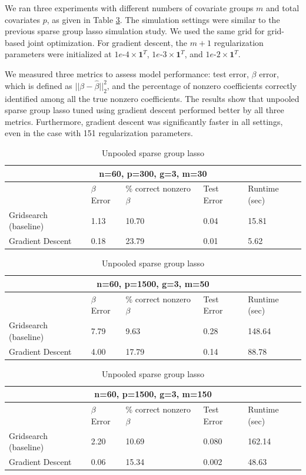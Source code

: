 \documentclass[10pt,letterpaper]{article}
\begin{document}
We ran three experiments with different numbers of covariate groups $m$ and total covariates $p$, as given in Table \ref{table:unpooled}. The simulation settings were similar to the previous sparse group lasso simulation study. We used the same grid for grid-based joint optimization. For gradient descent, the $m+1$ regularization parameters were initialized at $1e\text{-}4 \times \boldsymbol 1^T$, $1e\text{-}3 \times \boldsymbol 1^T$, and $1e\text{-}2 \times \boldsymbol 1^T$.

We measured three metrics to assess model performance: test error, $\beta$ error, which is defined as $\lvert \lvert \beta - \hat \beta \rvert \rvert_2 ^2$, and the percentage of nonzero coefficients correctly identified among all the true nonzero coefficients. The results show that unpooled sparse group lasso tuned using gradient descent performed better by all three metrics. Furthermore, gradient descent was significantly faster in all settings, even in the case with 151 regularization parameters.

\begin{table}
\begin{center}
\begin{tabular}{| l | l | l | l | l | }
\hline
\multicolumn{5}{|c|}{n=60, p=300, g=3, m=30}\\
\hline
 & $\beta$ Error & \% correct nonzero $\beta$ & Test Error & Runtime (sec) \\
\hline
Gridsearch (baseline) & 1.13 & 10.70 & 0.04 & 15.81 \\
\hline
Gradient Descent & 0.18 & 23.79 & 0.01 & 5.62 \\
\hline
\end{tabular}

\begin{tabular}{| l | l | l | l | l | }
\hline
\multicolumn{5}{|c|}{n=60, p=1500, g=3, m=50}\\
\hline
 & $\beta$ Error & \% correct nonzero $\beta$ & Test Error & Runtime (sec) \\
\hline
Gridsearch (baseline) & 7.79 & 9.63 & 0.28 & 148.64 \\
\hline
Gradient Descent & 4.00 & 17.79 & 0.14 & 88.78 \\
\hline
\end{tabular}

\begin{tabular}{| l | l | l | l | l | }
\hline
\multicolumn{5}{|c|}{n=60, p=1500, g=3, m=150}\\
\hline
 & $\beta$ Error & \% correct nonzero $\beta$ & Test Error & Runtime (sec) \\
\hline
Gridsearch (baseline) & 2.20 & 10.69 & 0.080 & 162.14 \\
\hline
Gradient Descent & 0.06 & 15.34 & 0.002 & 48.63 \\
\hline
\end{tabular}
\end{center}
\caption {Unpooled sparse group lasso}
\label{table:unpooled}
\end{table}
\end{document}
